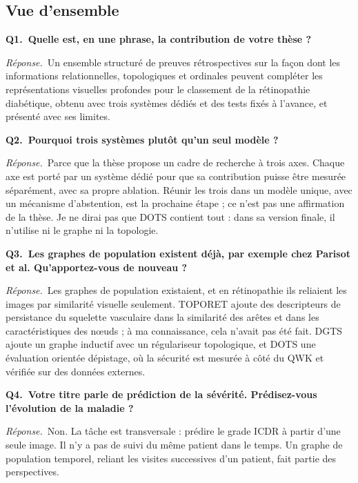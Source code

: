 \documentclass[11pt,a4paper]{article}
\begin{document}
\subsection*{Vue d'ensemble}
\textbf{Q1.~Quelle est, en une phrase, la contribution de votre thèse ?}\par\nopagebreak
\textit{Réponse.}~Un ensemble structuré de preuves rétrospectives sur la façon dont les informations relationnelles, topologiques et ordinales peuvent compléter les représentations visuelles profondes pour le classement de la rétinopathie diabétique, obtenu avec trois systèmes dédiés et des tests fixés à l'avance, et présenté avec ses limites.\par\medskip
\textbf{Q2.~Pourquoi trois systèmes plutôt qu'un seul modèle ?}\par\nopagebreak
\textit{Réponse.}~Parce que la thèse propose un cadre de recherche à trois axes. Chaque axe est porté par un système dédié pour que sa contribution puisse être mesurée séparément, avec sa propre ablation. Réunir les trois dans un modèle unique, avec un mécanisme d'abstention, est la prochaine étape ; ce n'est pas une affirmation de la thèse. Je ne dirai pas que DOTS contient tout : dans sa version finale, il n'utilise ni le graphe ni la topologie.\par\medskip
\textbf{Q3.~Les graphes de population existent déjà, par exemple chez Parisot et al. Qu'apportez-vous de nouveau ?}\par\nopagebreak
\textit{Réponse.}~Les graphes de population existaient, et en rétinopathie ils reliaient les images par similarité visuelle seulement. TOPORET ajoute des descripteurs de persistance du squelette vasculaire dans la similarité des arêtes et dans les caractéristiques des nœuds ; à ma connaissance, cela n'avait pas été fait. DGTS ajoute un graphe inductif avec un régulariseur topologique, et DOTS une évaluation orientée dépistage, où la sécurité est mesurée à côté du QWK et vérifiée sur des données externes.\par\medskip
\textbf{Q4.~Votre titre parle de prédiction de la sévérité. Prédisez-vous l'évolution de la maladie ?}\par\nopagebreak
\textit{Réponse.}~Non. La tâche est transversale : prédire le grade ICDR à partir d'une seule image. Il n'y a pas de suivi du même patient dans le temps. Un graphe de population temporel, reliant les visites successives d'un patient, fait partie des perspectives.\par\medskip
\end{document}
